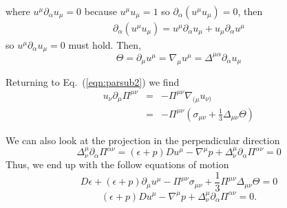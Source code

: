 \documentclass[aps,article]{revtex4}
\begin{document}
where $u^{\mu}\partial_{\alpha}u_{\mu}=0$ because $u^{\mu}u_{\mu}=1$ so $\partial_{\alpha}\left(u^{\mu}u_{\mu}\right)=0$, then
\begin{eqnarray}
\partial_{\alpha}\left(u^{\mu}u_{\mu}\right)=u^{\mu}\partial_{\alpha}u_{\mu}+u_{\mu}\partial_{\alpha}u^{\mu}
\end{eqnarray}
so $u^{\mu}\partial_{\alpha}u_{\mu}=0$ must hold.
Then, 
\begin{equation}
\Theta=\partial_{\mu}u^{\mu}=\nabla_{\mu}u^{\mu}=\Delta^{\mu\alpha}\partial_{\alpha}u_{\mu}
\end{equation}

Returning to Eq.\ (\ref{eqn:parsub2}) we find
\begin{eqnarray}
u_{\nu}\partial_{\mu}\Pi^{\mu\nu}&=&-\Pi^{\mu\nu}\nabla_{(\mu}u_{\nu)}\nonumber\\
&=&-\Pi^{\mu\nu}\left(\sigma_{\mu\nu}+\frac{1}{3}\Delta_{\mu\nu}\Theta\right)
\end{eqnarray}


We can also look at the projection in the perpendicular direction 
\begin{equation}
\Delta_{\nu}^{\mu}\partial_{\alpha}\Pi^{\alpha\nu}=\left(\epsilon+p\right) D u^{\mu}-\nabla^{\mu}p+\Delta^{\mu}_{\nu}\partial_{\alpha}\Pi^{\alpha\nu}=0
\end{equation}
Thus, we end up with the follow equations of motion
\begin{equation}\label{eqn:shearviscpre}
\boxed{D\epsilon+\left(\epsilon+p\right)\partial_{\mu}u^{\mu}-\Pi^{\mu\nu}\sigma_{\mu\nu}+\frac{1}{3}\Pi^{\mu\nu}\Delta_{\mu\nu}\Theta=0}
\end{equation}
\begin{equation}\label{eqn:bulkviscpre}
\boxed{\left(\epsilon+p\right) D u^{\mu}-\nabla^{\mu}p+\Delta^{\mu}_{\nu}\partial_{\alpha}\Pi^{\alpha\nu}=0}.
\end{equation}
\end{document}
